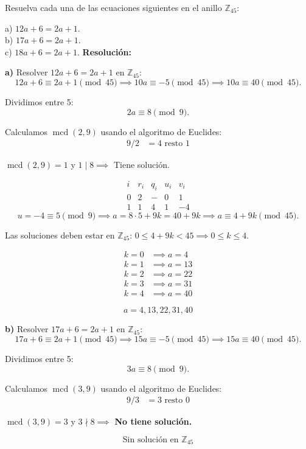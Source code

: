 \documentclass[a4paper,12pt]{article}
\begin{document}
\begin{ejercicio}[title=Ejercicio 42]
Resuelva cada una de las ecuaciones siguientes en el anillo $\mathbb{Z}_{45}$:

a) $12a + 6 = 2a + 1$.  \\
b) $17a + 6 = 2a + 1$.  \\
c) $18a + 6 = 2a + 1$.
\tcblower
\textbf{Resolución:}

\textbf{a) } Resolver $12a + 6 = 2a + 1$ en $\mathbb{Z}_{45}$:
\[
12a + 6 \equiv 2a + 1 \pmod{45} \implies 10a \equiv -5 \pmod{45} \implies 10a \equiv 40 \pmod{45}.
\]

Dividimos entre 5: 
\[
2a \equiv 8 \pmod{9}.
\]

Calculamos \(\operatorname{mcd}(2,9)\) usando el algoritmo de Euclides:
\begin{align*}
9 / 2 &= 4 \text{ resto } \boxed{1} 
\end{align*}

\(\operatorname{mcd}(2,9) = 1\) y $1 \mid 8 \implies$ Tiene solución.

\[
\begin{array}{c|c|c|c|c}
i & r_i & q_i & u_i & v_i \\
\hline
0 & 2 & - & 0 & 1 \\
1 & \boxed{1} & 4 & 1 & -4
\end{array}
\]
\[
u = -4 \equiv 5 \pmod{9} \implies a = 8 \cdot 5 + 9 k = 40 + 9 k \implies a \equiv 4 + 9 k \pmod{45}.
\]

Las soluciones deben estar en $\mathbb{Z}_{45}$: $0 \le 4 + 9 k < 45 \implies 0 \le k \le 4$.  

\[
\begin{aligned}
k = 0 &\implies a = 4 \\
k = 1 &\implies a = 13 \\
k = 2 &\implies a = 22 \\
k = 3 &\implies a = 31 \\
k = 4 &\implies a = 40
\end{aligned}
\]

\[
\boxed{a = 4, 13, 22, 31, 40}
\]

\textbf{b) } Resolver $17a + 6 = 2a + 1$ en $\mathbb{Z}_{45}$:
\[
17a + 6 \equiv 2a + 1 \pmod{45} \implies 15a \equiv -5 \pmod{45} \implies 15a \equiv 40 \pmod{45}.
\]

Dividimos entre 5:
\[
3a \equiv 8 \pmod{9}.
\]

Calculamos \(\operatorname{mcd}(3,9)\) usando el algoritmo de Euclides:
\begin{align*}
9 / 3 &= 3 \text{ resto } \boxed{0}
\end{align*}

\(\operatorname{mcd}(3,9) = 3\) y $3 \nmid 8 \implies$ \textbf{No tiene solución.}

\[
\boxed{\text{Sin solución en } \mathbb{Z}_{45}}
\]

\end{ejercicio}
\end{document}
